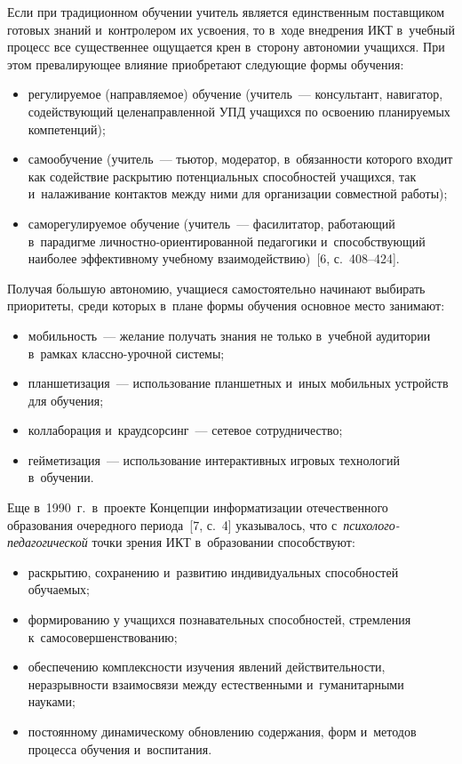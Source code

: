 \begin{multicols}{2}
  Если при традиционном обучении учитель является единственным поставщиком готовых
знаний и~контролером их усвоения, то в~ходе внедрения ИКТ в~учебный процесс все
существеннее ощущается крен в~сторону автономии учащихся. При этом превалирующее
влияние приобретают следующие формы обучения:
  \begin{itemize}
\item регулируемое (направляемое) обучение (учи\-тель~--- кон\-суль\-тант, навигатор,
содействующий целенаправленной УПД учащихся по освоению планируемых
компетенций);
\item самообучение (учитель~--- тьютор, модератор, в~обязанности которого входит как
содействие раскрытию потенциальных способностей учащихся, так и~налаживание
контактов между ними для организации совместной работы);
\item саморегулируемое обучение (учитель~--- фасилитатор, работающий в~парадигме
личностно-ори\-ен\-ти\-ро\-ван\-ной педагогики и~спо\-соб\-ст\-ву\-ющий наиболее эффективному
учебному взаимодей\-ствию)~[6, с.~408--424].
\end{itemize}

  Получая б$\acute{\mbox{о}}$льшую автономию, учащиеся самостоятельно начинают
выбирать приоритеты, среди которых в~плане формы обучения основное место занимают:
  \begin{itemize}
\item мобильность~--- желание получать знания не только в~учебной аудитории в~рамках
классно-уроч\-ной системы;
\item планшетизация~--- использование планшетных и~иных мобильных устройств для
обучения;
\item коллаборация и~краудсорсинг~--- сетевое сотрудничество;
\item гейметизация~--- использование интерактивных игровых технологий в~обучении.
\end{itemize}

  Еще в~1990~г.\ в~проекте Концепции информатизации отечественного образования
очередного периода~[7, с.~4] указывалось, что с~\textit{пси\-хо\-ло\-го-пе\-да\-го\-ги\-че\-ской}
точки зрения ИКТ в~образовании способствуют:
  \begin{itemize}
\item раскрытию, сохранению и~развитию индивидуальных способностей обучаемых;
\item формированию у учащихся познавательных способностей, стремления к~самосовершенствованию;
\item обеспечению комплексности изучения явлений действительности, неразрывности
взаимосвязи между естественными и~гуманитарными нау\-ками;
\item постоянному динамическому обновлению содержания, форм и~методов процесса
обучения и~воспитания.
\end{itemize}


\end{multicols}
